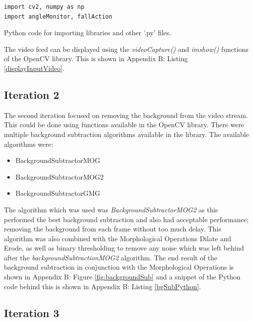 \documentclass[11pt,a4paper]{report}
\begin{document}
\begin{listing}
\begin{verbatim}
import cv2, numpy as np
import angleMonitor, fallAction
\end{verbatim}
\caption{Python code for importing libraries and other '.py' files.}
\label{PythonImports}
\end{listing}
\noindent
The video feed can be displayed using the \textit{videoCapture()} and \textit{imshow()} functions of the OpenCV library. This is shown in Appendix B: Listing \ref{displayInputVideo}.

\subsection{Iteration 2}

The second iteration focused on removing the background from the video stream. This could be done using functions available in the OpenCV library. There were multiple background subtraction algorithms available in the library. The available algorithms were:

\begin{itemize}
  \item BackgroundSubtractorMOG
  \item BackgroundSubtractorMOG2
  \item BackgroundSubtractorGMG
\end{itemize}
\noindent
The algorithm which was used was \textit{BackgroundSubtractorMOG2} as this performed the best background subtraction and also had acceptable performance; removing the background from each frame without too much delay. This algorithm was also combined with the Morphological Operations Dilate and Erode, as well as binary thresholding to remove any noise which was left behind after the \textit{backgroundSubtractionMOG2} algorithm. The end result of the background subtraction in conjunction with the Morphological Operations is shown in Appendix B: Figure \ref{fig:backgroundSub} and a snippet of the Python code behind this is shown in Appendix B: Listing \ref{bgSubPython}.

\subsection{Iteration 3}
\end{document}
